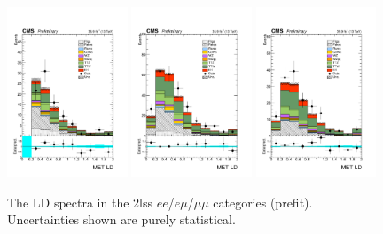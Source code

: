 \begin{figure}[htp]
\centering
\includegraphics[width=0.32\textwidth]{ch5_figs/metLD_ttH_ee_stackPlot_SR.pdf}
\includegraphics[width=0.32\textwidth]{ch5_figs/metLD_ttH_em_stackPlot_SR.pdf}
\includegraphics[width=0.32\textwidth]{ch5_figs/metLD_ttH_mm_stackPlot_SR.pdf} \\
\caption[Data/MC comparison of the \met LD distribution in the signal region]{The \met LD spectra in the 2lss $ee$/$e\mu$/$\mu\mu$ categories (prefit). Uncertainties shown are purely statistical.}
\label{fig:sr_metLD}
\end{figure}
